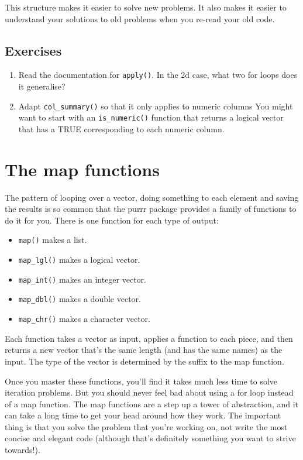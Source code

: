 \documentclass[]{book}
\providecommand{\tightlist}{%
  \setlength{\itemsep}{0pt}\setlength{\parskip}{0pt}}
\begin{document}
This structure makes it easier to solve new problems. It also makes it
easier to understand your solutions to old problems when you re-read
your old code.

\subsection{Exercises}\label{exercises-57}

\begin{enumerate}
\def\labelenumi{\arabic{enumi}.}
\item
  Read the documentation for \texttt{apply()}. In the 2d case, what two
  for loops does it generalise?
\item
  Adapt \texttt{col\_summary()} so that it only applies to numeric
  columns You might want to start with an \texttt{is\_numeric()}
  function that returns a logical vector that has a TRUE corresponding
  to each numeric column.
\end{enumerate}

\section{The map functions}\label{the-map-functions}

The pattern of looping over a vector, doing something to each element
and saving the results is so common that the purrr package provides a
family of functions to do it for you. There is one function for each
type of output:

\begin{itemize}
\tightlist
\item
  \texttt{map()} makes a list.
\item
  \texttt{map\_lgl()} makes a logical vector.
\item
  \texttt{map\_int()} makes an integer vector.
\item
  \texttt{map\_dbl()} makes a double vector.
\item
  \texttt{map\_chr()} makes a character vector.
\end{itemize}

Each function takes a vector as input, applies a function to each piece,
and then returns a new vector that's the same length (and has the same
names) as the input. The type of the vector is determined by the suffix
to the map function.

Once you master these functions, you'll find it takes much less time to
solve iteration problems. But you should never feel bad about using a
for loop instead of a map function. The map functions are a step up a
tower of abstraction, and it can take a long time to get your head
around how they work. The important thing is that you solve the problem
that you're working on, not write the most concise and elegant code
(although that's definitely something you want to strive towards!).
\end{document}
